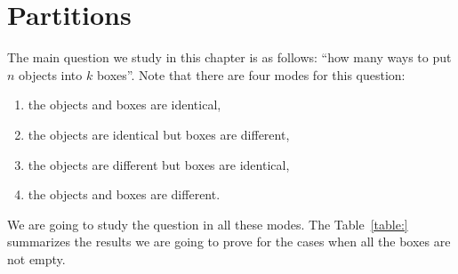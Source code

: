 \chapter{Partitions}
The main question we study in this chapter is as follows:
``how many ways to put $n$ objects into $k$ boxes''.
Note that there are four modes for this question:
\begin{enumerate}
  \item the objects and boxes are identical,
  \item the objects are identical but boxes are different,
  \item the objects are different but boxes are identical,
  \item the objects and boxes are different.
\end{enumerate}
We are going to study the question in all these modes.
The Table~\ref{table:} summarizes the results we are going
to prove for the cases when all the boxes are not empty.
